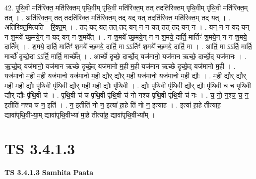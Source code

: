 \documentclass[17pt]{extarticle}
\begin{document}
42. पृ॒थि॒वी मति॑रिक्त॒ मति॑रिक्तम् पृथि॒वीम् पृ॑थि॒वी मति॑रिक्त॒म् तत् तदति॑रिक्तम् पृथि॒वीम् पृ॑थि॒वी मति॑रिक्त॒म् तत् । . अति॑रिक्त॒म् तत् तदति॑रिक्त॒ मति॑रिक्त॒म् तद् यद् यत् तदति॑रिक्त॒ मति॑रिक्त॒म् तद् यत् । . अति॑रिक्त॒मित्यति॑ - रि॒क्त॒म् । . तद् यद् यत् तत् तद् यन् न न यत् तत् तद् यन् न । . यन् न न यद् यन् न श॒मये᳚ च्छ॒मये॒न् न यद् यन् न श॒मये᳚त् । . न श॒मये᳚ च्छ॒मये॒न् न न श॒मये॒ दार्ति॒ मार्तिꣳ॑ श॒मये॒न् न न श॒मये॒ दार्ति᳚म् । . श॒मये॒ दार्ति॒ मार्तिꣳ॑ श॒मये᳚ च्छ॒मये॒ दार्ति॒ मा ऽऽर्तिꣳ॑ श॒मये᳚ च्छ॒मये॒ दार्ति॒ मा । . आर्ति॒ मा ऽऽर्ति॒ मार्ति॒ मार्च्छे॑ दृच्छे॒दा ऽऽर्ति॒ मार्ति॒ मार्च्छे᳚त् । . आर्च्छे॑ दृच्छे॒ दार्च्छे॒द् यज॑मानो॒ यज॑मान ऋच्छे॒ दार्च्छे॒द् यज॑मानः । . ऋ॒च्छे॒द् यज॑मानो॒ यज॑मान ऋच्छे दृच्छे॒द् यज॑मानो म॒ही म॒ही यज॑मान ऋच्छे दृच्छे॒द् यज॑मानो म॒ही । . यज॑मानो म॒ही म॒ही यज॑मानो॒ यज॑मानो म॒ही द्यौर् द्यौर् म॒ही यज॑मानो॒ यज॑मानो म॒ही द्यौः । . म॒ही द्यौर् द्यौर् म॒ही म॒ही द्यौः पृ॑थि॒वी पृ॑थि॒वी द्यौर् म॒ही म॒ही द्यौः पृ॑थि॒वी । . द्यौः पृ॑थि॒वी पृ॑थि॒वी द्यौर् द्यौः पृ॑थि॒वी च॑ च पृथि॒वी द्यौर् द्यौः पृ॑थि॒वी च॑ । . पृ॒थि॒वी च॑ च पृथि॒वी पृ॑थि॒वी च॑ नो नश्च पृथि॒वी पृ॑थि॒वी च॑ नः । . च॒ नो॒ न॒श्च॒ च॒ न॒ इतीति॑ नश्च च न॒ इति॑ । . न॒ इतीति॑ नो न॒ इत्या॑ हा॒हे ति॑ नो न॒ इत्या॑ह । . इत्या॑ हा॒हे तीत्या॑ह॒ द्यावा॑पृथि॒वीभ्या॒म् द्यावा॑पृथि॒वीभ्या॑ मा॒हे तीत्या॑ह॒ द्यावा॑पृथि॒वीभ्या᳚म् । \newline
\pagebreak
{}

\section{ TS 3.4.1.3 }

\textbf{TS 3.4.1.3 } \newline
\textbf{Samhita Paata} \newline
\end{document}
